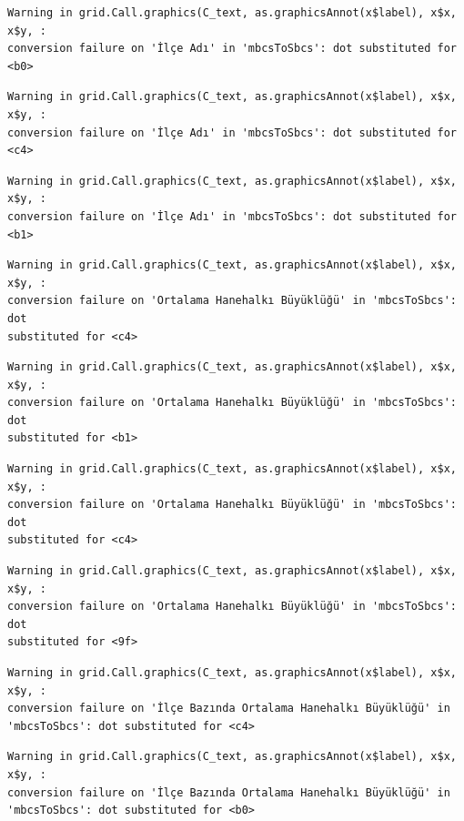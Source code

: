 \documentclass[
  11pt,
  a4paper,
  DIV=11,
  numbers=noendperiod]{scrartcl}
\begin{document}
\begin{verbatim}
Warning in grid.Call.graphics(C_text, as.graphicsAnnot(x$label), x$x, x$y, :
conversion failure on 'İlçe Adı' in 'mbcsToSbcs': dot substituted for <b0>
\end{verbatim}

\begin{verbatim}
Warning in grid.Call.graphics(C_text, as.graphicsAnnot(x$label), x$x, x$y, :
conversion failure on 'İlçe Adı' in 'mbcsToSbcs': dot substituted for <c4>
\end{verbatim}

\begin{verbatim}
Warning in grid.Call.graphics(C_text, as.graphicsAnnot(x$label), x$x, x$y, :
conversion failure on 'İlçe Adı' in 'mbcsToSbcs': dot substituted for <b1>
\end{verbatim}

\begin{verbatim}
Warning in grid.Call.graphics(C_text, as.graphicsAnnot(x$label), x$x, x$y, :
conversion failure on 'Ortalama Hanehalkı Büyüklüğü' in 'mbcsToSbcs': dot
substituted for <c4>
\end{verbatim}

\begin{verbatim}
Warning in grid.Call.graphics(C_text, as.graphicsAnnot(x$label), x$x, x$y, :
conversion failure on 'Ortalama Hanehalkı Büyüklüğü' in 'mbcsToSbcs': dot
substituted for <b1>
\end{verbatim}

\begin{verbatim}
Warning in grid.Call.graphics(C_text, as.graphicsAnnot(x$label), x$x, x$y, :
conversion failure on 'Ortalama Hanehalkı Büyüklüğü' in 'mbcsToSbcs': dot
substituted for <c4>
\end{verbatim}

\begin{verbatim}
Warning in grid.Call.graphics(C_text, as.graphicsAnnot(x$label), x$x, x$y, :
conversion failure on 'Ortalama Hanehalkı Büyüklüğü' in 'mbcsToSbcs': dot
substituted for <9f>
\end{verbatim}

\begin{verbatim}
Warning in grid.Call.graphics(C_text, as.graphicsAnnot(x$label), x$x, x$y, :
conversion failure on 'İlçe Bazında Ortalama Hanehalkı Büyüklüğü' in
'mbcsToSbcs': dot substituted for <c4>
\end{verbatim}

\begin{verbatim}
Warning in grid.Call.graphics(C_text, as.graphicsAnnot(x$label), x$x, x$y, :
conversion failure on 'İlçe Bazında Ortalama Hanehalkı Büyüklüğü' in
'mbcsToSbcs': dot substituted for <b0>
\end{verbatim}
\end{document}
